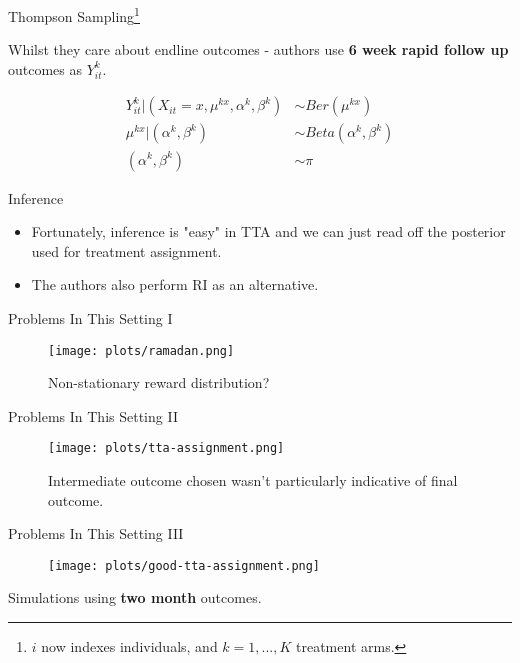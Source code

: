 \documentclass[aspectratio=169,xcolor=dvipsnames]{beamer}
\begin{document}
\begin{frame}{Thompson Sampling\footnote{$i$ now indexes individuals, and $k = 1, ..., K$ treatment arms.}}

    Whilst they care about endline outcomes - authors use \textbf{6 week rapid follow up} outcomes as
    $Y_{it}^k$.

    \begin{align*}
       Y_{it}^k | (X_{it} = x, \mu^{kx}, \alpha^k, \beta^k) &\sim Ber(\mu^{kx}) \\
       \mu^{kx} | (\alpha^k, \beta^k) &\sim Beta(\alpha^k, \beta^k) \\
       (\alpha^k, \beta^k) &\sim \pi
    \end{align*}

\end{frame}




\begin{frame}{Inference}

    \begin{itemize}
        \item Fortunately, inference is "easy" in TTA and we can just read off the posterior 
    used for treatment assignment.
        \item The authors also perform RI as an alternative.
    \end{itemize}

\end{frame}


\begin{frame}{Problems In This Setting I}


    \begin{figure}[htbp]
        \centering
       \texttt{[image: plots/ramadan.png]} 
        \caption{Non-stationary reward distribution?}
    \end{figure}
\end{frame}

\begin{frame}{Problems In This Setting II}

    \begin{figure}[htbp]
        \centering
       \texttt{[image: plots/tta-assignment.png]} 
       \caption{Intermediate outcome chosen wasn't particularly indicative of 
       final outcome.}
    \end{figure}
    

\end{frame}

\begin{frame}{Problems In This Setting III}

   \begin{figure}[htbp]
       \centering
      \texttt{[image: plots/good-tta-assignment.png]} 
   \end{figure} 

       Simulations using \textbf{two month} outcomes.
\end{frame}
\end{document}
